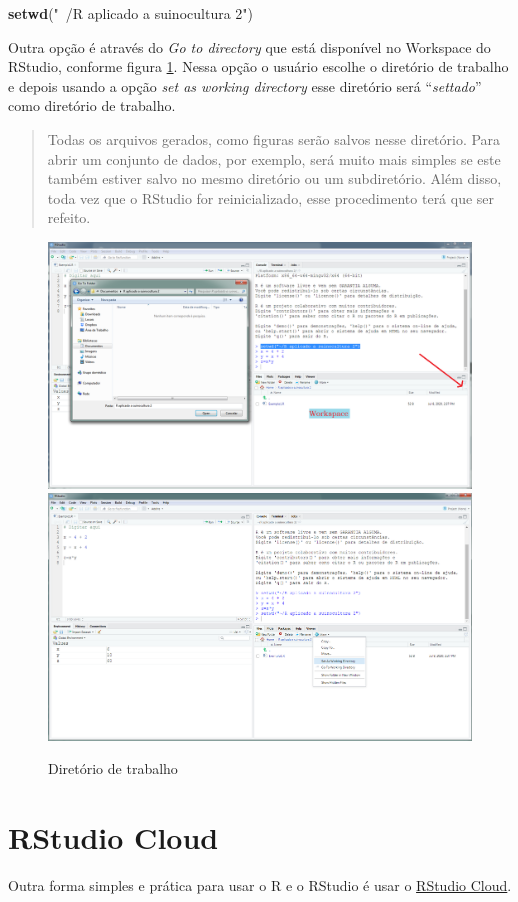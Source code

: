 \documentclass[
]{book}
\newenvironment{Shaded}{\begin{snugshade}}{\end{snugshade}}
\newcommand{\KeywordTok}[1]{\textcolor[rgb]{0.13,0.29,0.53}{\textbf{#1}}}
\newcommand{\NormalTok}[1]{#1}
\newcommand{\StringTok}[1]{\textcolor[rgb]{0.31,0.60,0.02}{#1}}
\begin{document}
\begin{Shaded}
\begin{Highlighting}[]
\KeywordTok{setwd}\NormalTok{(}\StringTok{"~/R aplicado a suinocultura 2"}\NormalTok{)}
\end{Highlighting}
\end{Shaded}

Outra opção é através do \emph{Go to directory} que está disponível no Workspace do RStudio, conforme figura \ref{fig:rstudio2}. Nessa opção o usuário escolhe o diretório de trabalho e depois usando a opção \emph{set as working directory} esse diretório será ``\emph{settado}'' como diretório de trabalho.

\begin{quote}
Todas os arquivos gerados, como figuras serão salvos nesse diretório. Para abrir um conjunto de dados, por exemplo, será muito mais simples se este também estiver salvo no mesmo diretório ou um subdiretório. Além disso, toda vez que o RStudio for reinicializado, esse procedimento terá que ser refeito.
\end{quote}

\begin{figure}
\includegraphics[width=0.46\linewidth]{Figuras/RStudio2} \includegraphics[width=0.46\linewidth]{Figuras/RStudio3} \caption{Diretório de trabalho}\label{fig:rstudio2}
\end{figure}

\hypertarget{rstudio-cloud}{%
\section{RStudio Cloud}\label{rstudio-cloud}}

Outra forma simples e prática para usar o R e o RStudio é usar o \href{https://rstudio.cloud/}{RStudio Cloud}.
\end{document}
